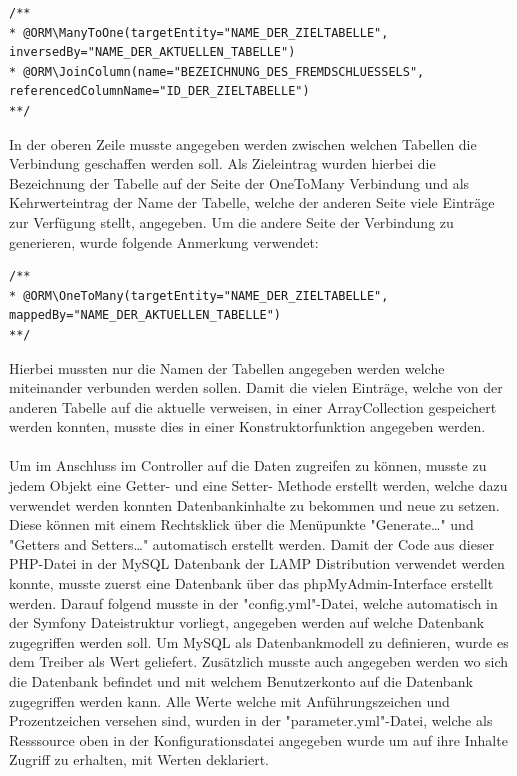 	\lstset{language=php}
  	\begin{lstlisting}
/**
* @ORM\ManyToOne(targetEntity="NAME_DER_ZIELTABELLE", 
inversedBy="NAME_DER_AKTUELLEN_TABELLE")
* @ORM\JoinColumn(name="BEZEICHNUNG_DES_FREMDSCHLUESSELS", 
referencedColumnName="ID_DER_ZIELTABELLE")
**/
  	\end{lstlisting}
In der oberen Zeile musste angegeben werden zwischen welchen Tabellen die Verbindung geschaffen werden soll. Als Zieleintrag wurden hierbei die Bezeichnung der Tabelle auf der Seite der OneToMany Verbindung und als Kehrwerteintrag der Name der Tabelle, welche der anderen Seite viele Einträge zur Verfügung stellt, angegeben.
Um die andere Seite der Verbindung zu generieren, wurde folgende Anmerkung verwendet:
	
	\lstset{language=php}
  	\begin{lstlisting}
/**
* @ORM\OneToMany(targetEntity="NAME_DER_ZIELTABELLE", 
mappedBy="NAME_DER_AKTUELLEN_TABELLE")
**/
  	\end{lstlisting}
Hierbei mussten nur die Namen der Tabellen angegeben werden welche miteinander verbunden werden sollen. Damit die vielen Einträge, welche von der anderen Tabelle auf die aktuelle verweisen, in einer ArrayCollection gespeichert werden konnten, musste dies in einer Konstruktorfunktion angegeben werden.
\\ \\
Um im Anschluss im Controller auf die Daten zugreifen zu können, musste zu jedem Objekt eine Getter- und eine Setter- Methode erstellt werden, welche dazu verwendet werden konnten Datenbankinhalte zu bekommen und neue zu setzen. Diese können mit einem Rechtsklick über die Menüpunkte "Generate…" und "Getters and Setters…" automatisch erstellt werden.
Damit der Code aus dieser PHP-Datei in der MySQL Datenbank der LAMP Distribution verwendet werden konnte, musste zuerst eine Datenbank über das phpMyAdmin-Interface erstellt werden. Darauf folgend musste in der "config.yml"-Datei, welche automatisch in der Symfony Dateistruktur vorliegt, angegeben werden auf welche Datenbank zugegriffen werden soll.
Um MySQL als Datenbankmodell zu definieren, wurde es dem Treiber als Wert geliefert. Zusätzlich musste auch angegeben werden wo sich die Datenbank befindet und mit welchem Benutzerkonto auf die Datenbank zugegriffen werden kann.
Alle Werte welche mit Anführungszeichen und Prozentzeichen versehen sind, wurden in der "parameter.yml"-Datei, welche als Resssource oben in der Konfigurationsdatei angegeben wurde um auf ihre Inhalte Zugriff zu erhalten, mit Werten deklariert.
